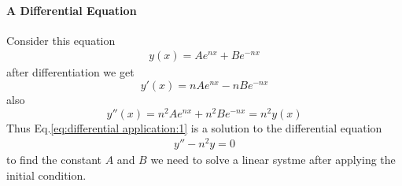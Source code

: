         \paragraph{A Differential Equation}
            Consider this equation 
            \begin{align}
                \label{eq:differential application:1}
                y(x) = Ae^{nx} + Be^{-nx}
            \end{align} 
            after differentiation we get $$ y'(x) = nAe^{nx} - n Be^{-nx} $$
            also
            $$ y''(x) = n^2 A e^{nx} + n^2 B e^{-nx} = n^2 y(x)$$
            Thus Eq.\eqref{eq:differential application:1} is a solution to the differential equation
            \begin{align}
                y'' - n^2y = 0 
            \end{align}
            to find the constant $A$ and $B$ we need to solve a linear systme after applying the initial condition.

